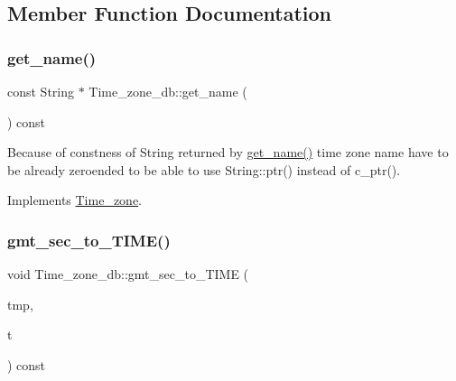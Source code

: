 \subsection{Member Function Documentation}
\mbox{\label{classTime__zone__db_a64a55114c5945e21840cdc4862f4b831}} 
\subsubsection{\texorpdfstring{get\+\_\+name()}{get\_name()}}
{\footnotesize\ttfamily const String $\ast$ Time\+\_\+zone\+\_\+db\+::get\+\_\+name (\begin{DoxyParamCaption}{ }\end{DoxyParamCaption}) const\hspace{0.3cm}{\ttfamily [virtual]}}

Because of constness of String returned by \mbox{\hyperlink{classTime__zone__db_a64a55114c5945e21840cdc4862f4b831}{get\+\_\+name()}} time zone name have to be already zeroended to be able to use String\+::ptr() instead of c\+\_\+ptr(). 

Implements \mbox{\hyperlink{classTime__zone_a8116436f7b8e19dc4b99cd78a786e47f}{Time\+\_\+zone}}.

\mbox{\label{classTime__zone__db_a25ecf69eb2b6802ecd8d7db2166bcecb}} 
\subsubsection{\texorpdfstring{gmt\+\_\+sec\+\_\+to\+\_\+\+T\+I\+M\+E()}{gmt\_sec\_to\_TIME()}}
{\footnotesize\ttfamily void Time\+\_\+zone\+\_\+db\+::gmt\+\_\+sec\+\_\+to\+\_\+\+T\+I\+ME (\begin{DoxyParamCaption}\item[{M\+Y\+S\+Q\+L\+\_\+\+T\+I\+ME $\ast$}]{tmp,  }\item[{my\+\_\+time\+\_\+t}]{t }\end{DoxyParamCaption}) const\hspace{0.3cm}{\ttfamily [virtual]}}


